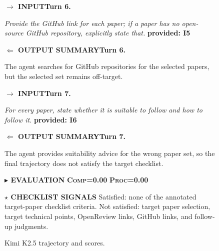 \documentclass{llmxive}
\providecommand{\caseLeihaodiTwoTag}[3]{    {\setlength{\fboxsep}{1.6pt}\colorbox{#1}{\scriptsize\textbf{#3}}}}
\providecommand{\caseLeihaodiTwoLine}[3]{    \caseLeihaodiTwoTag{#1}{#2}{#3}\hspace{3pt}}
\providecommand{\caseLeihaodiTwoIO}[3]{    \vspace{2pt}
    \noindent\caseLeihaodiTwoLine{#1}{white}{#2}\textbf{#3}
}
\begin{document}
\begin{figure}[!htbp]
{    \vspace{2pt}
    \caseLeihaodiTwoIO{blue!65!black}{$\rightarrow$ INPUT}{Turn 6.}
    \emph{Provide the GitHub link for each paper; if a paper has no open-source GitHub repository, explicitly state that.}
    \caseLeihaodiTwoTag{red!15}{red!70!black}{provided: I5}

    \caseLeihaodiTwoIO{green!45!black}{$\Leftarrow$ OUTPUT SUMMARY}{Turn 6.}
    The agent searches for GitHub repositories for the selected papers, but the selected set remains off-target.

    \vspace{2pt}
    \caseLeihaodiTwoIO{blue!65!black}{$\rightarrow$ INPUT}{Turn 7.}
    \emph{For every paper, state whether it is suitable to follow and how to follow it.}
    \caseLeihaodiTwoTag{red!15}{red!70!black}{provided: I6}

    \caseLeihaodiTwoIO{green!45!black}{$\Leftarrow$ OUTPUT SUMMARY}{Turn 7.}
    The agent provides suitability advice for the wrong paper set, so the final trajectory does not satisfy the target checklist.

    \vspace{3pt}
    \caseLeihaodiTwoLine{purple!70!black}{white}{$\blacktriangleright$ EVALUATION}
    \caseLeihaodiTwoTag{orange!15}{orange!80!black}{\textsc{Comp}=0.00}
    \hspace{3pt}
    \caseLeihaodiTwoTag{cyan!15}{cyan!45!black}{\textsc{Proc}=0.00}

    \vspace{2pt}
    \noindent\caseLeihaodiTwoLine{orange!80!black}{white}{$\star$ CHECKLIST SIGNALS}
    Satisfied: none of the annotated target-paper checklist criteria.
    Not satisfied: target paper selection, target technical points, OpenReview links, GitHub links, and follow-up judgments.
    }
    \caption{Kimi K2.5 trajectory and scores.}
    \label{fig:case_leihaodi_2_kimi_trajectory}
\end{figure}





% 
\end{document}
